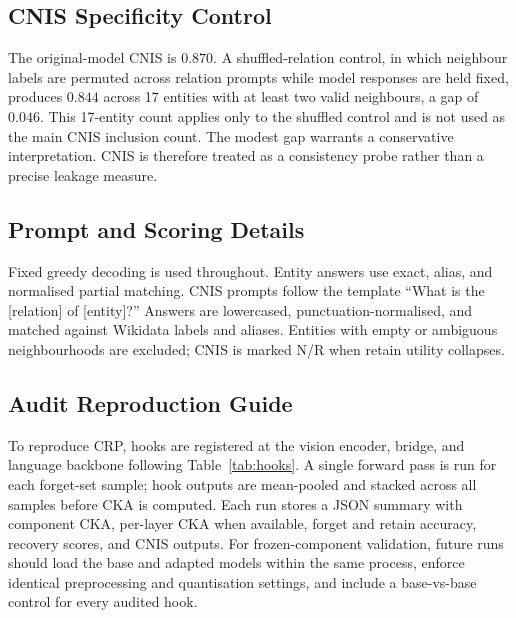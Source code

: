 \documentclass[letterpaper]{article}
\begin{document}
\subsection{CNIS Specificity Control}
\label{app:cnis}

The original-model CNIS is $0.870$. A shuffled-relation control, in which
neighbour labels are permuted across relation prompts while model responses
are held fixed, produces $0.844$ across 17 entities with at least two valid
neighbours, a gap of $0.046$. This 17-entity count applies only to the
shuffled control and is not used as the main CNIS inclusion count. The modest
gap warrants a conservative interpretation. CNIS is therefore treated as a
consistency probe rather than a precise leakage measure.

\subsection{Prompt and Scoring Details}

Fixed greedy decoding is used throughout. Entity answers use exact, alias, and
normalised partial matching. CNIS prompts follow the template ``What is the
[relation] of [entity]?'' Answers are lowercased, punctuation-normalised, and
matched against Wikidata labels and aliases. Entities with empty or ambiguous
neighbourhoods are excluded; CNIS is marked N/R when retain utility collapses.

\subsection{Audit Reproduction Guide}

To reproduce CRP, hooks are registered at the vision encoder, bridge, and
language backbone following Table~\ref{tab:hooks}. A single forward pass is
run for each forget-set sample; hook outputs are mean-pooled and stacked
across all samples before CKA is computed. Each run stores a JSON summary with
component CKA, per-layer CKA when available, forget and retain accuracy,
recovery scores, and CNIS outputs. For frozen-component validation, future
runs should load the base and adapted models within the same process, enforce
identical preprocessing and quantisation settings, and include a base-vs-base
control for every audited hook.
\end{document}
